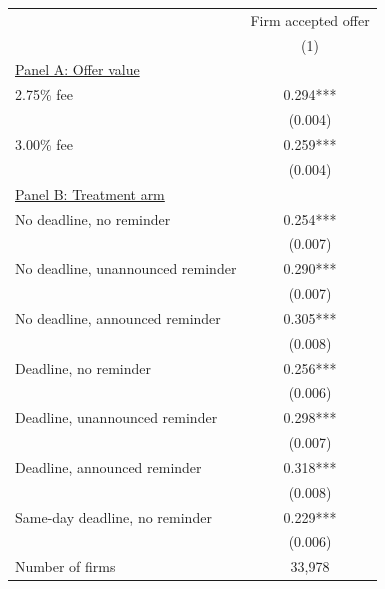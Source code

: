 \begin{tabular}[t]{lc} 
\toprule 
& Firm accepted offer \\ 
& (1) \\ 
\midrule 
 \underline{Panel A: Offer value} & \\ 
2.75\% fee & 0.294*** \\ 
 & (0.004) \\ 
3.00\% fee & 0.259*** \\ 
 & (0.004) \\ 
 \underline{Panel B: Treatment arm} & \\ 
No deadline, no reminder & 0.254*** \\ 
 & (0.007) \\ 
No deadline, unannounced reminder & 0.290*** \\ 
 & (0.007) \\ 
No deadline, announced reminder & 0.305*** \\ 
 & (0.008) \\ 
Deadline, no reminder & 0.256*** \\ 
 & (0.006) \\ 
Deadline, unannounced reminder & 0.298*** \\ 
 & (0.007) \\ 
Deadline, announced reminder & 0.318*** \\ 
 & (0.008) \\ 
Same-day deadline, no reminder & 0.229*** \\ 
 & (0.006) \\ 
\midrule 
Number of firms & 33,978 \\ 
\bottomrule 
\end{tabular}
